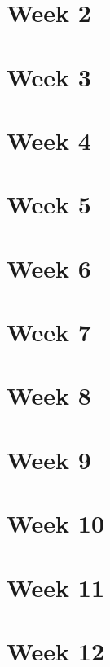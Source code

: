 \documentclass{article}
\begin{document}
\pagebreak
\section{Week 2}

\pagebreak
\section{Week 3}

\pagebreak
\section{Week 4}

\pagebreak
\section{Week 5}

\pagebreak
\section{Week 6}

\pagebreak
\section{Week 7}

\pagebreak
\section{Week 8}

\pagebreak
\section{Week 9}

\pagebreak
\section{Week 10}

\pagebreak
\section{Week 11}

\pagebreak
\section{Week 12}
\end{document}
